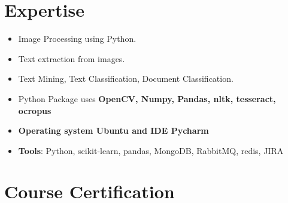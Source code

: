 \documentclass[letterpaper]{twentysecondcv} %
\begin{document}
\section{Expertise}
\begin{twenty}
	\twentyitem
    	{}
		{}
        {}
        {\href{}{}}
        {}
        {
        \vspace{-6 mm}

        {\begin{itemize}
		\item Image Processing using Python.
		\item Text extraction from images.
		\item Text Mining, Text Classification, Document Classification.
	\item Python Package uses \textbf{OpenCV, Numpy, Pandas, nltk, tesseract, ocropus}
		\item \textbf{Operating system Ubuntu and IDE Pycharm}
        \item \textbf{Tools}: Python, scikit-learn, pandas, MongoDB, RabbitMQ, redis, JIRA
        \vspace{2mm}
		\end{itemize}}
        }
\end{twenty}
\section{Course Certification}
\end{document}
